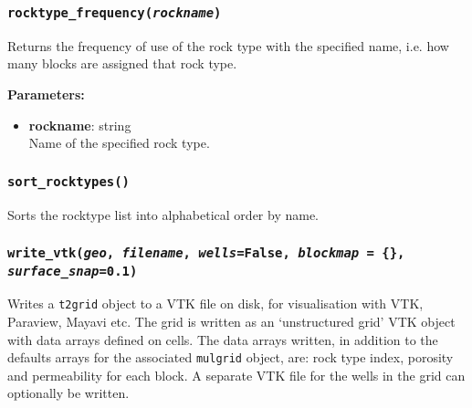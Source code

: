\begin{snugshade}
\subsubsection{\texttt{rocktype\_frequency(\emph{rockname})}}
\end{snugshade}
\label{sec:t2grid:rocktype_frequency}

Returns the frequency of use of the rock type with the specified name, i.e. how many blocks are assigned that rock type.

\textbf{Parameters:}
\begin{itemize}
\item \textbf{rockname}: string\\
  Name of the specified rock type.
\end{itemize}

\begin{snugshade}
\subsubsection{\texttt{sort\_rocktypes()}}
\end{snugshade}
\label{sec:t2grid:sort_rocktypes}

Sorts the rocktype list into alphabetical order by name.

\begin{snugshade}
\subsubsection{\texttt{write\_vtk(\emph{geo}, \emph{filename}, \emph{wells}=False, \emph{blockmap} = \{\}, \emph{surface\_snap}=0.1)}}
\end{snugshade}
\label{sec:t2grid:write_vtk}

Writes a \texttt{t2grid} object to a VTK file on disk, for visualisation with VTK, Paraview, Mayavi etc.  The grid is written as an `unstructured grid' VTK object with data arrays defined on cells.  The data arrays written, in addition to the defaults arrays for the associated \texttt{mulgrid} object, are: rock type index, porosity and permeability for each block.  A separate VTK file for the wells in the grid can optionally be written.

